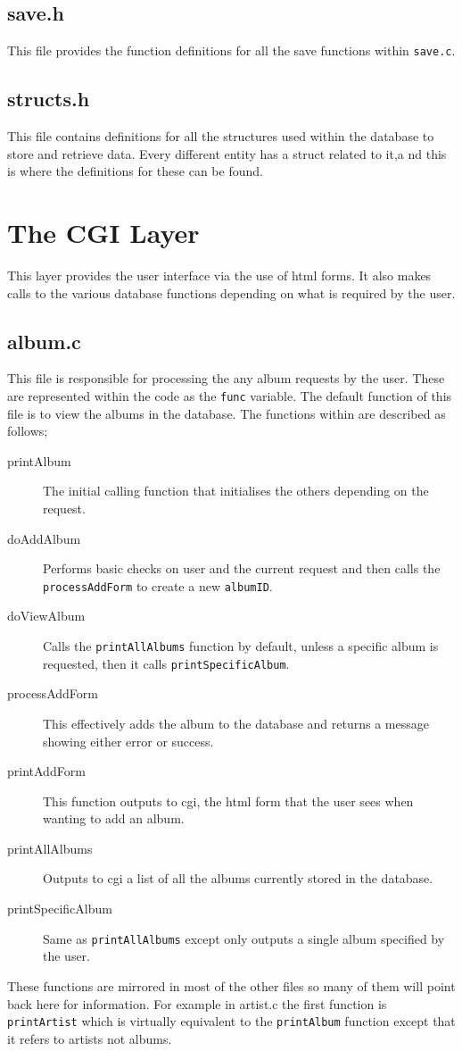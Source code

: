 \documentclass{article}
\begin{document}
\subsection{save.h}
This file provides the function definitions for all the save functions within \verb|save.c|.

\subsection{structs.h}
This file contains definitions for all the structures used within the database to store and retrieve data. Every different entity has a struct related to it,a nd this is where the definitions for these can be found.

\section{The CGI Layer}
This layer provides the user interface via the use of html forms. It also makes calls to the various database functions depending on what is required by the user.

\subsection{album.c}
This file is responsible for processing the any album requests by the user. These are represented within the code as the \verb|func| variable. The default function of this file is to view the albums in the database. The functions within are described as follows;
\begin{description}
\item[printAlbum] The initial calling function that initialises the others depending on the request.
\item[doAddAlbum]Performs basic checks on user and the current request and then calls the \verb|processAddForm| to create a new \verb|albumID|.
\item[doViewAlbum]Calls the \verb|printAllAlbums| function by default, unless a specific album is requested, then it calls \verb|printSpecificAlbum|.
\item[processAddForm] This effectively adds the album to the database and returns a message showing either error or success.
\item[printAddForm] This function outputs to cgi, the html form that the user sees when wanting to add an album.
\item[printAllAlbums]
Outputs to cgi a list of all the albums currently stored in the database.
\item[printSpecificAlbum]
Same as \verb|printAllAlbums| except only outputs a single album specified by the user.
\end{description}
These functions are mirrored in most of the other files so many of them will point back here for information. For example in artist.c the first function is \verb|printArtist| which is virtually equivalent to the \verb|printAlbum| function except that it refers to artists not albums. 
\end{document}
